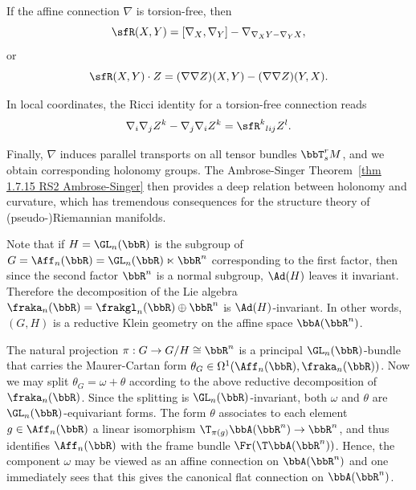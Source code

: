 \begin{cor}
    If the affine connection $\nabla$ is torsion-free, then 
    \[\sfR(X,Y)=[\nabla_X,\nabla_Y]-\nabla_{\nabla_X Y-\nabla_Y X},\]
    or
    \[\sfR(X,Y)\cdot Z=(\nabla\nabla Z)(X,Y)-(\nabla\nabla Z)(Y,X).\]
\end{cor}

\begin{rem}
    In local coordinates, the Ricci identity for a torsion-free connection reads 
    \[\nabla_i \nabla_j Z^k-\nabla_j\nabla_i Z^k=\sfR^k{}_{lij}Z^l.\]
\end{rem}

Finally, $\nabla$ induces parallel transports on all tensor bundles $\bbT^r_s M$, and we obtain corresponding holonomy groups. The Ambrose-Singer Theorem~\ref{thm 1.7.15 RS2 Ambrose-Singer} then provides a deep relation between holonomy and curvature, which has tremendous consequences for the structure theory of (pseudo-)Riemannian manifolds.


\begin{rem}\label{rem 1.3.5 Cap}
    Note that if $H=\GL_n(\bbR)$ is the subgroup of $G=\Aff_n(\bbR)=\GL_n(\bbR)\ltimes \bbR^n$ corresponding to the first factor, then since the second factor $\bbR^n$ is a normal subgroup, $\Ad(H)$ leaves it invariant. Therefore the decomposition of the Lie algebra $\fraka_n(\bbR)=\frakgl_n(\bbR)\oplus \bbR^n$ is $\Ad(H)$-invariant. In other words, $(G,H)$ is a reductive Klein geometry on the affine space $\bbA(\bbR^n)$.

    The natural projection $\pi:G\to G\slash H\cong \bbR^n$ is a principal $\GL_n(\bbR)$-bundle that carries the Maurer-Cartan form $\theta_G\in\Omega^1(\Aff_n(\bbR),\fraka_n(\bbR))$. Now we may split $\theta_G=\omega+\theta$ according to the above reductive decomposition of $\fraka_n(\bbR)$. Since the splitting is $\GL_n(\bbR)$-invariant, both $\omega$ and $\theta$ are $\GL_n(\bbR)$-equivariant forms. The form $\theta$ associates to each element $g\in \Aff_n(\bbR)$ a linear isomorphism $\T_{\pi(g)}\bbA(\bbR^n)\to \bbR^n$, and thus identifies $\Aff_n(\bbR)$ with the frame bundle $\Fr(\T \bbA(\bbR^n))$. Hence, the component $\omega$ may be viewed as an affine connection on $\bbA(\bbR^n)$ and one immediately sees that this gives the canonical flat connection on $\bbA(\bbR^n)$.
\end{rem}

